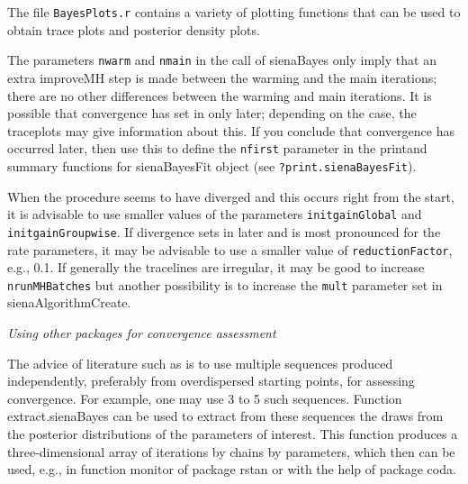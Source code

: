 \documentclass[a4paper,fleqn,11pt]{article}
\newcommand{\+}{\, + \,}
\newcommand{\sfn}[1]{\textsf{#1}}
\begin{document}
The file \texttt{BayesPlots.r} contains a variety of plotting functions that
can be used to obtain trace plots and posterior density plots.

The parameters \texttt{nwarm} and \texttt{nmain} in the call of
\textsf{sienaBayes} only imply
that an extra \sfn{improveMH} step is made between the warming and the
main iterations; there are no other differences between the warming
and main iterations. It is possible that convergence has set in only
later; depending on the case, the traceplots may give information about this.
If you conclude that convergence has occurred later, then use this to
define the \texttt{nfirst} parameter in the \textsf{print}and
\textsf{summary} functions for
\sfn{sienaBayesFit} object (see \texttt{?print.sienaBayesFit}).

When the procedure seems to have diverged and this occurs right
from the start, it is
advisable to use smaller values of the parameters \texttt{initgainGlobal}
and \texttt{initgainGroupwise}.
If divergence sets in later and is most pronounced
for the rate parameters, it may be advisable to use a smaller value of
\texttt{reductionFactor}, e.g., 0.1.
If generally the tracelines are irregular, it may be good to increase
\texttt{nrunMHBatches} but another possibility is to increase
the \texttt{mult} parameter set in \sfn{sienaAlgorithmCreate}.

\medskip

\noindent
\emph{Using other packages for convergence assessment}
\smallskip

\noindent
The advice of literature such as \citet{BDA3} is to use multiple
sequences produced independently, preferably from overdispersed
starting points, for assessing convergence.
For example, one may use 3 to 5 such sequences.
Function \sfn{extract.sienaBayes} can be used to extract
from these sequences the draws from the posterior distributions
of the parameters of interest.
This function produces a three-dimensional array of
iterations by chains by parameters, which then can be used, e.g., in
function \sfn{monitor} of package \sfn{rstan} or with the
help of package \sfn{coda}.
\end{document}

